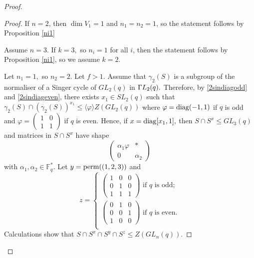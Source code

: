 \begin{proof}
\begin{proof}
If $n=2$, then $\dim V_1=1$ and $n_1=n_2=1$, so the statement follows by Proposition \ref{ni1} 


Assume $n=3$.  If $k=3,$ so $n_i=1$ for all $i$, then the statement follows by Proposition \ref{ni1}, so we assume $k=2.$

Let $n_1=1,$ so $n_2=2.$ Let $f>1.$ Assume that $\gamma_2(S)$ is a subgroup of the normaliser of a Singer cycle of $GL_2(q)$ in ${{\Gamma L}}_2(q).$ Therefore, by \eqref{2sindiagodd} and \eqref{2sindiageven}, there exists $x_1 \in SL_2(q)$ such that $\gamma_2(S) \cap (\gamma_2(S))^{x_1} \le \langle \varphi \rangle Z(GL_2(q))$ where $\varphi = \mathrm{diag}(-1,1)$ if $q$ is odd and $\varphi = \begin{pmatrix}
1 & 0\\
1 & 1
\end{pmatrix}$ if $q$ is even. Hence, if $x=\mathrm{diag}[x_1,1],$ then $S \cap S^x \le GL_3(q)$ and matrices in $S \cap S^x$ have shape 
$$
 \begin{pmatrix}
\alpha_1 \varphi & *\\
0 & \alpha_2
\end{pmatrix}
$$ with $\alpha_1, \alpha_2 \in \mathbb{F}_q^*.$ Let $y=\mathrm{perm}((1,2,3))$ and 
$$
z=
\begin{cases}
\begin{pmatrix}
1&0&0\\
0&1&0\\
1&1&1
\end{pmatrix} \text{ if $q$ is odd;}\\
\begin{pmatrix}
0&1&0\\
0&0&1\\
1&0&0
\end{pmatrix} \text{ if $q$ is even.}\\
\end{cases}
$$
Calculations show that $S \cap S^x \cap S^y \cap S^z \le Z(GL_n(q)).$


\end{proof}
\end{proof}
